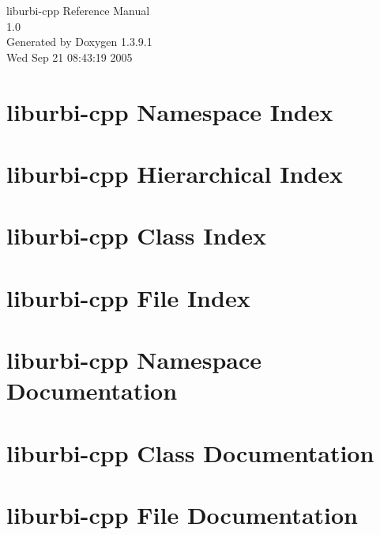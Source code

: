 \documentclass[a4paper]{book}
\begin{document}
\begin{titlepage}
\vspace*{7cm}
\begin{center}
{\Large liburbi-cpp Reference Manual\\[1ex]\large 1.0 }\\
\vspace*{1cm}
{\large Generated by Doxygen 1.3.9.1}\\
\vspace*{0.5cm}
{\small Wed Sep 21 08:43:19 2005}\\
\end{center}
\end{titlepage}
\clearemptydoublepage
{}
\tableofcontents
\clearemptydoublepage
{}
\chapter{liburbi-cpp Namespace Index}

\chapter{liburbi-cpp Hierarchical Index}

\chapter{liburbi-cpp Class Index}

\chapter{liburbi-cpp File Index}

\chapter{liburbi-cpp Namespace Documentation}

\chapter{liburbi-cpp Class Documentation}







\chapter{liburbi-cpp File Documentation}





\printindex
\end{document}
